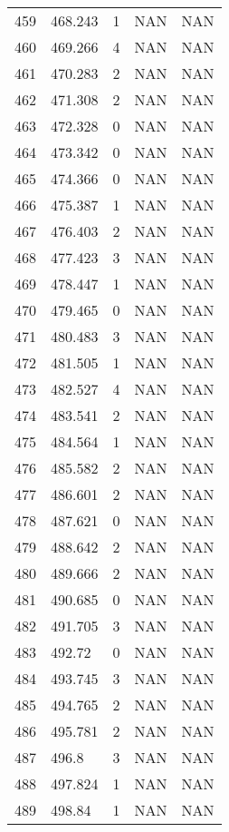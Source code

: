 \documentclass{article}
\begin{document}
\begin{longtable}{@{}lllll@{}}
				459 & 468.243 & 1     & NAN   & NAN   \\
				460 & 469.266 & 4     & NAN   & NAN   \\
				461 & 470.283 & 2     & NAN   & NAN   \\
				462 & 471.308 & 2     & NAN   & NAN   \\
				463 & 472.328 & 0     & NAN   & NAN   \\
				464 & 473.342 & 0     & NAN   & NAN   \\
				465 & 474.366 & 0     & NAN   & NAN   \\
				466 & 475.387 & 1     & NAN   & NAN   \\
				467 & 476.403 & 2     & NAN   & NAN   \\
				468 & 477.423 & 3     & NAN   & NAN   \\
				469 & 478.447 & 1     & NAN   & NAN   \\
				470 & 479.465 & 0     & NAN   & NAN   \\
				471 & 480.483 & 3     & NAN   & NAN   \\
				472 & 481.505 & 1     & NAN   & NAN   \\
				473 & 482.527 & 4     & NAN   & NAN   \\
				474 & 483.541 & 2     & NAN   & NAN   \\
				475 & 484.564 & 1     & NAN   & NAN   \\
				476 & 485.582 & 2     & NAN   & NAN   \\
				477 & 486.601 & 2     & NAN   & NAN   \\
				478 & 487.621 & 0     & NAN   & NAN   \\
				479 & 488.642 & 2     & NAN   & NAN   \\
				480 & 489.666 & 2     & NAN   & NAN   \\
				481 & 490.685 & 0     & NAN   & NAN   \\
				482 & 491.705 & 3     & NAN   & NAN   \\
				483 & 492.72  & 0     & NAN   & NAN   \\
				484 & 493.745 & 3     & NAN   & NAN   \\
				485 & 494.765 & 2     & NAN   & NAN   \\
				486 & 495.781 & 2     & NAN   & NAN   \\
				487 & 496.8   & 3     & NAN   & NAN   \\
				488 & 497.824 & 1     & NAN   & NAN   \\
				489 & 498.84  & 1     & NAN   & NAN   \\

\end{longtable}
\end{document}
